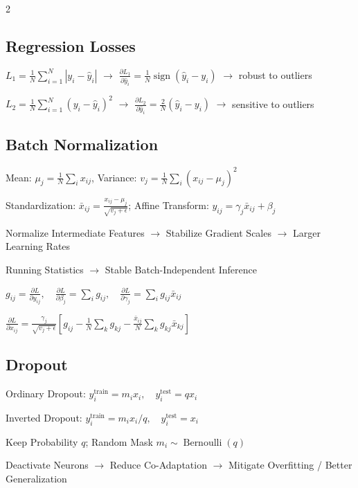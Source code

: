 \documentclass[a4paper]{article}
\let\originalsum\sum
\renewcommand{\sum}{\mathop{\textstyle\originalsum}\nolimits}
\begin{document}
\begin{multicols}{2}
\subsection*{Regression Losses}
\noindent \(\displaystyle L_1=\frac{1}{N}\sum_{i=1}^{N}|y_i-\hat y_i|\) \(\to\) \(\displaystyle \frac{\partial L_1}{\partial \hat y_i} =\frac{1}{N}\operatorname{sign}(\hat y_i-y_i)\) \(\to\) robust to outliers\par
\noindent \(\displaystyle L_2=\frac{1}{N}\sum_{i=1}^{N}(y_i-\hat y_i)^2\) \(\to\) \(\displaystyle \frac{\partial L_2}{\partial \hat y_i} =\frac{2}{N}(\hat y_i-y_i)\) \(\to\) sensitive to outliers\par
\subsection*{Batch Normalization}
\noindent Mean: \(\displaystyle \mu_j=\frac1N\sum_i x_{ij}\), Variance: \(\displaystyle v_j=\frac1N\sum_i(x_{ij}-\mu_j)^2\)\par
\noindent Standardization: \(\displaystyle \bar x_{ij}=\frac{x_{ij}-\mu_j}{\sqrt{v_j+\epsilon}}\); Affine Transform: \(\displaystyle y_{ij}=\gamma_j\bar x_{ij}+\beta_j\)\par
\noindent Normalize Intermediate Features \(\to\) Stabilize Gradient Scales \(\to\) Larger Learning Rates\par
\noindent Running Statistics \(\to\) Stable Batch-Independent Inference\par
\noindent \(\displaystyle g_{ij}=\frac{\partial L}{\partial y_{ij}},\quad \frac{\partial L}{\partial \beta_j}=\sum_i g_{ij},\quad \frac{\partial L}{\partial \gamma_j}=\sum_i g_{ij}\bar x_{ij}\)\par
\noindent \(\displaystyle \frac{\partial L}{\partial x_{ij}}=\frac{\gamma_j}{\sqrt{v_j+\epsilon}}\left[g_{ij}-\frac1N\sum_k g_{kj}-\frac{\bar x_{ij}}{N}\sum_k g_{kj}\bar x_{kj}\right]\)\par
\subsection*{Dropout}
\noindent Ordinary Dropout: \(\displaystyle y_i^{\mathrm{train}}=m_ix_i, \quad y_i^{\mathrm{test}}=qx_i\)\par
\noindent Inverted Dropout: \(\displaystyle y_i^{\mathrm{train}}=m_ix_i/q, \quad y_i^{\mathrm{test}}=x_i\)\par
\noindent Keep Probability \(\displaystyle q\); Random Mask \(\displaystyle m_i\sim\operatorname{Bernoulli}(q)\)\par
\noindent Deactivate Neurons \(\to\) Reduce Co-Adaptation \(\to\) Mitigate Overfitting / Better Generalization\par

\end{multicols}
\end{document}
